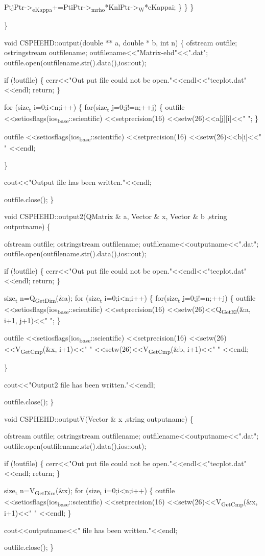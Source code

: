 \documentclass[presentation]{beamer}
\begin{document}
           PtjPtr->\textsubscript{eKappa}+=PtiPtr->\textsubscript{mrho}*KnlPtr->\textsubscript{W}*eKappai;
         \}
    \}
\}

\}




void CSPHEHD::output(double ** a, double * b, int n)
\{
  ofstream outfile;
  ostringstream outfilename;
  outfilename<<"Matrix-ehd"<<".dat";
  outfile.open(outfilename.str().data(),ios::out);

if (!outfile)
  \{
    cerr<<"Out put file could not be open."<<endl<<"tecplot.dat"<<endl;
    return;
  \}

for (size\textsubscript{t} i=0;i<n;i++)
  \{
    for(size\textsubscript{t} j=0;j!=n;++j)
      \{
        outfile
          <<setiosflags(ios\textsubscript{base}::scientific)
          <<setprecision(16)
          <<setw(26)<<a[j][i]<<" ";
      \}

outfile
  <<setiosflags(ios\textsubscript{base}::scientific)
  <<setprecision(16)
  <<setw(26)<<b[i]<<" "
  <<endl;

\}


cout<<"Output file has been written."<<endl;

  outfile.close();
\}


void CSPHEHD::output2(QMatrix \& a, Vector \& x, Vector \& b ,string outputname)
\{

ofstream outfile;
ostringstream outfilename;
outfilename<<outputname<<".dat";
outfile.open(outfilename.str().data(),ios::out);

if (!outfile)
  \{
    cerr<<"Out put file could not be open."<<endl<<"tecplot.dat"<<endl;
    return;
  \}

size\textsubscript{t} n=Q\textsubscript{GetDim}(\&a);
for (size\textsubscript{t} i=0;i<n;i++)
  \{
    for(size\textsubscript{t} j=0;j!=n;++j)
      \{
        outfile
          <<setiosflags(ios\textsubscript{base}::scientific)
          <<setprecision(16)
          <<setw(26)<<Q\textsubscript{GetEl}(\&a, i+1, j+1)<<" ";
      \}

outfile
  <<setiosflags(ios\textsubscript{base}::scientific)
  <<setprecision(16)
  <<setw(26)<<V\textsubscript{GetCmp}(\&x, i+1)<<" "
  <<setw(26)<<V\textsubscript{GetCmp}(\&b, i+1)<<" "
  <<endl;

\}


cout<<"Output2 file has been written."<<endl;

   outfile.close();
\}


void CSPHEHD::outputV(Vector \& x ,string outputname)
\{

ofstream outfile;
ostringstream outfilename;
outfilename<<outputname<<".dat";
outfile.open(outfilename.str().data(),ios::out);

if (!outfile)
  \{
    cerr<<"Out put file could not be open."<<endl<<"tecplot.dat"<<endl;
    return;
  \}

size\textsubscript{t} n=V\textsubscript{GetDim}(\&x);
for (size\textsubscript{t} i=0;i<n;i++)
  \{
    outfile
      <<setiosflags(ios\textsubscript{base}::scientific)
      <<setprecision(16)
      <<setw(26)<<V\textsubscript{GetCmp}(\&x, i+1)<<" "
      <<endl;
  \}


cout<<outputname<<" file has been written."<<endl;

  outfile.close();
\}
\end{document}
